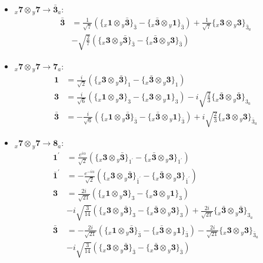 \documentclass[english]{article}
\newcommand{\rep}[1]{\mathbf{#1}}
\newcommand{\repx}[2]{{}_{#2}\mathbf{#1}}
\newcommand{\tsprodx}[2]{\repx{#1}{x}\otimes\repx{#2}{y}}
\newcommand{\subcgt}[3]{\big\{ \tsprodx{#1}{#2}\big\}^{}_{#3}}
\begin{document}
\begin{itemize}
\begin{align*}
\end{align*}
\item $\tsprodx{7}{7}\to\rep{\bar{3}}_{a}$:
\begin{align*}
\rep{\bar{3}} & = \frac{1}{\sqrt{7}}\left(\subcgt{1}{\bar{3}}{\bar{3}}-\subcgt{\bar{3}}{1}{\bar{3}}\right)+\frac{1}{\sqrt{7}}\subcgt{3}{3}{\bar{3}_{a}} \\ 
 & -\sqrt{\frac{2}{7}}\left(\subcgt{3}{\bar{3}}{\bar{3}}-\subcgt{\bar{3}}{3}{\bar{3}}\right)
\end{align*}
\item $\tsprodx{7}{7}\to\rep{7}_{a}$:
\begin{align*}
\rep{1} & = \frac{i}{\sqrt{2}}\left(\subcgt{3}{\bar{3}}{1}-\subcgt{\bar{3}}{3}{1}\right)
\\
\rep{3} & = \frac{i}{\sqrt{6}}\left(\subcgt{1}{3}{3}-\subcgt{3}{1}{3}\right)-i \sqrt{\frac{2}{3}}\subcgt{\bar{3}}{\bar{3}}{3_{a}}
\\
\rep{\bar{3}} & = -\frac{i}{\sqrt{6}}\left(\subcgt{1}{\bar{3}}{\bar{3}}-\subcgt{\bar{3}}{1}{\bar{3}}\right)+i \sqrt{\frac{2}{3}}\subcgt{3}{3}{\bar{3}_{a}}
\end{align*}
\item $\tsprodx{7}{7}\to\rep{8}_{a}$:
\begin{align*}
\rep{1^{\prime}} & = \frac{e^{i \alpha }}{\sqrt{2}}\left(\subcgt{3}{\bar{3}}{1^{\prime}}-\subcgt{\bar{3}}{3}{1^{\prime}}\right)
\\
\rep{\bar{1}^{\prime}} & = -\frac{e^{-i \alpha }}{\sqrt{2}}\left(\subcgt{3}{\bar{3}}{\bar{1}^{\prime}}-\subcgt{\bar{3}}{3}{\bar{1}^{\prime}}\right)
\\
\rep{3} & = \frac{2 i}{\sqrt{21}}\left(\subcgt{1}{3}{3}-\subcgt{3}{1}{3}\right) \\ 
 & -i \sqrt{\frac{3}{14}}\left(\subcgt{3}{\bar{3}}{3}-\subcgt{\bar{3}}{3}{3}\right)+\frac{2 i}{\sqrt{21}}\subcgt{\bar{3}}{\bar{3}}{3_{a}}
\\
\rep{\bar{3}} & = -\frac{2 i}{\sqrt{21}}\left(\subcgt{1}{\bar{3}}{\bar{3}}-\subcgt{\bar{3}}{1}{\bar{3}}\right)-\frac{2 i}{\sqrt{21}}\subcgt{3}{3}{\bar{3}_{a}} \\ 
 & -i \sqrt{\frac{3}{14}}\left(\subcgt{3}{\bar{3}}{\bar{3}}-\subcgt{\bar{3}}{3}{\bar{3}}\right)
\end{align*}
\end{itemize}
\end{document}
